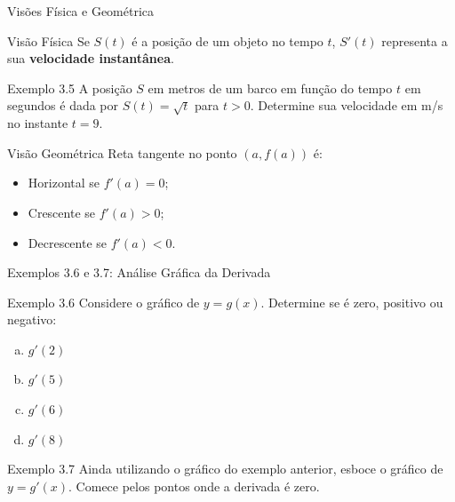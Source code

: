 \documentclass[10pt, aspectratio=169]{beamer}
\begin{document}
\begin{frame}{Visões Física e Geométrica}
  \begin{block}{Visão Física}
    Se $S(t)$ é a posição de um objeto no tempo $t$, $S'(t)$ representa a sua \textbf{velocidade instantânea}.
  \end{block}

  \begin{exampleblock}{Exemplo 3.5}
    A posição $S$ em metros de um barco em função do tempo $t$ em segundos é dada por $S(t) = \sqrt{t}$ para $t > 0$. Determine sua velocidade em m/s no instante $t = 9$.
  \end{exampleblock}

  \begin{block}{Visão Geométrica}
    Reta tangente no ponto $(a, f(a))$ é:
    \begin{itemize}
      \item Horizontal se $f'(a) = 0$;
      \item Crescente se $f'(a) > 0$;
      \item Decrescente se $f'(a) < 0$.
    \end{itemize}
  \end{block}
\end{frame}

\begin{frame}{Exemplos 3.6 e 3.7: Análise Gráfica da Derivada}
  \begin{exampleblock}{Exemplo 3.6}
    Considere o gráfico de $y = g(x)$. Determine se é zero, positivo ou negativo:
    \begin{enumerate}[(a)]
      \item $g'(2)$
      \item $g'(5)$
      \item $g'(6)$
      \item $g'(8)$
    \end{enumerate}
  \end{exampleblock}

  \begin{exampleblock}{Exemplo 3.7}
    Ainda utilizando o gráfico do exemplo anterior, esboce o gráfico de $y = g'(x)$. Comece pelos pontos onde a derivada é zero.
  \end{exampleblock}
\end{frame}
\end{document}
